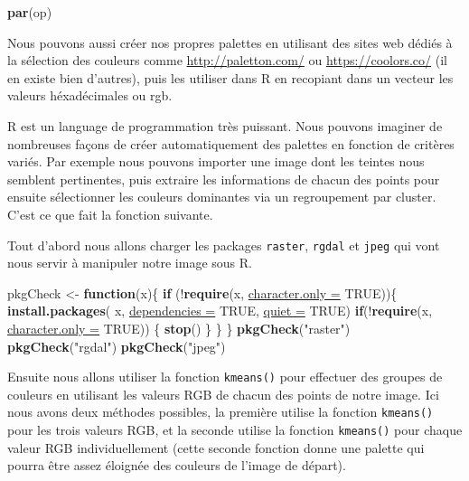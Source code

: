 \documentclass[twoside,symmetric]{book}
\newenvironment{Shaded}{}{}
\newcommand{\ControlFlowTok}[1]{\textbf{#1}}
\newcommand{\DataTypeTok}[1]{\underline{#1}}
\newcommand{\KeywordTok}[1]{\textbf{#1}}
\newcommand{\NormalTok}[1]{#1}
\newcommand{\OperatorTok}[1]{#1}
\newcommand{\OtherTok}[1]{#1}
\newcommand{\StringTok}[1]{#1}
\begin{document}
\begin{Shaded}
\begin{Highlighting}[]
\KeywordTok{par}\NormalTok{(op)}
\end{Highlighting}
\end{Shaded}

Nous pouvons aussi créer nos propres palettes en utilisant des sites web dédiés à la sélection des couleurs comme \url{http://paletton.com/} ou \url{https://coolors.co/} (il en existe bien d'autres), puis les utiliser dans R en recopiant dans un vecteur les valeurs héxadécimales ou rgb.

R est un language de programmation très puissant. Nous pouvons imaginer de nombreuses façons de créer automatiquement des palettes en fonction de critères variés. Par exemple nous pouvons importer une image dont les teintes nous semblent pertinentes, puis extraire les informations de chacun des points pour ensuite sélectionner les couleurs dominantes via un regroupement par cluster. C'est ce que fait la fonction suivante.

Tout d'abord nous allons charger les packages \texttt{raster}, \texttt{rgdal} et \texttt{jpeg} qui vont nous servir à manipuler notre image sous R.

\begin{Shaded}
\begin{Highlighting}[]
\NormalTok{pkgCheck <-}\StringTok{ }\ControlFlowTok{function}\NormalTok{(x)\{ }
    \ControlFlowTok{if}\NormalTok{ (}\OperatorTok{!}\KeywordTok{require}\NormalTok{(x, }\DataTypeTok{character.only =} \OtherTok{TRUE}\NormalTok{))\{}
        \KeywordTok{install.packages}\NormalTok{(}
\NormalTok{          x, }\DataTypeTok{dependencies =} \OtherTok{TRUE}\NormalTok{, }\DataTypeTok{quiet =} \OtherTok{TRUE}\NormalTok{)}
        \ControlFlowTok{if}\NormalTok{(}\OperatorTok{!}\KeywordTok{require}\NormalTok{(x, }\DataTypeTok{character.only =} \OtherTok{TRUE}\NormalTok{)) \{}
            \KeywordTok{stop}\NormalTok{()}
\NormalTok{        \}}
\NormalTok{    \}}
\NormalTok{\}}
\KeywordTok{pkgCheck}\NormalTok{(}\StringTok{"raster"}\NormalTok{)}
\KeywordTok{pkgCheck}\NormalTok{(}\StringTok{"rgdal"}\NormalTok{)}
\KeywordTok{pkgCheck}\NormalTok{(}\StringTok{"jpeg"}\NormalTok{)}
\end{Highlighting}
\end{Shaded}

Ensuite nous allons utiliser la fonction \texttt{kmeans()} pour effectuer des groupes de couleurs en utilisant les valeurs RGB de chacun des points de notre image. Ici nous avons deux méthodes possibles, la première utilise la fonction \texttt{kmeans()} pour les trois valeurs RGB, et la seconde utilise la fonction \texttt{kmeans()} pour chaque valeur RGB individuellement (cette seconde fonction donne une palette qui pourra être assez éloignée des couleurs de l'image de départ).
\end{document}

